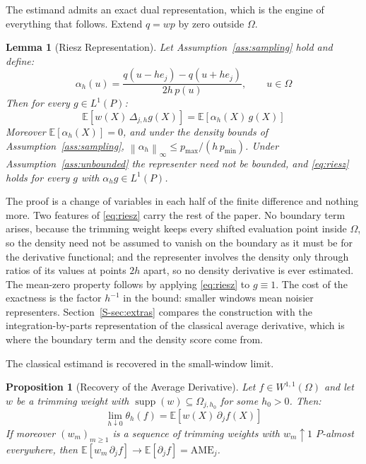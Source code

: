 \documentclass[12pt,a4paper]{article}
\numberwithin{equation}{section}
\theoremstyle{plain}
\newtheorem{lemma}{Lemma}
\newtheorem{proposition}{Proposition}
\theoremstyle{definition}
\newcommand{\norm}[1]{\left\| #1 \right\|}
\newcommand{\E}{\mathbb{E}}
\newcommand{\Dh}{\Delta_{j,h}}
\begin{document}
	
	The estimand admits an exact dual representation, which is the engine of everything
	that follows. Extend $q = wp$ by zero outside $\Omega$.
	
	\begin{lemma}[Riesz Representation]
		\label{lem:riesz}
		Let Assumption~\ref{ass:sampling} hold and define:
		\begin{equation}
			\alpha_h(u) = \frac{q(u - h e_j) - q(u + h e_j)}{2h\, p(u)},
			\qquad u \in \Omega
		\end{equation}
		Then for every $g \in L^1(P)$:
		\begin{equation}
			\E\left[w(X)\, \Dh g(X)\right] = \E\left[\alpha_h(X)\, g(X)\right]
			\label{eq:riesz}
		\end{equation}
		Moreover $\E[\alpha_h(X)] = 0$, and under the density bounds of
		Assumption~\ref{ass:sampling},
		$\norm{\alpha_h}_\infty \leq p_{\max} / (h\, p_{\min})$. Under
		Assumption~\ref{ass:unbounded} the representer need not be bounded, and
		\eqref{eq:riesz} holds for every $g$ with $\alpha_h g \in L^1(P)$.
	\end{lemma}
	
	The proof is a change of variables in each half of the finite difference and
	nothing more. Two features of \eqref{eq:riesz} carry the rest of the paper.
	No boundary term arises, because the trimming weight keeps every shifted
	evaluation point inside $\Omega$, so the density need not be assumed to
	vanish on the boundary as it must be for the derivative functional; and the
	representer involves the density only through ratios of its values at points
	$2h$ apart, so no density derivative is ever estimated. The mean-zero property
	follows by applying \eqref{eq:riesz} to $g \equiv 1$. The cost of the
	exactness is the factor $h^{-1}$ in the bound: smaller windows mean noisier
	representers. Section~\ref{S-sec:extras} compares the construction with the
	integration-by-parts representation of the classical average derivative, which
	is where the boundary term and the density score come from.

	The classical estimand is recovered in the small-window limit.
	
	\begin{proposition}[Recovery of the Average Derivative]
		\label{prop:hlimit}
		Let $f \in W^{1,1}(\Omega)$ and let $w$ be a trimming weight with
		$\operatorname{supp}(w) \subseteq \Omega_{j,h_0}$ for some $h_0 > 0$. Then:
		\begin{equation}
			\lim_{h \downarrow 0} \theta_h(f)
			= \E\left[w(X)\, \partial_j f(X)\right]
		\end{equation}
		If moreover $(w_m)_{m \geq 1}$ is a sequence of trimming weights with
		$w_m \uparrow 1$ $P$-almost everywhere, then
		$\E[w_m\, \partial_j f] \to \E[\partial_j f] = \mathrm{AME}_j$.
	\end{proposition}
	
\end{document}
